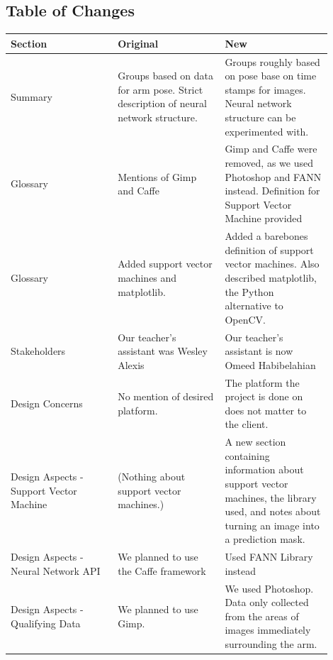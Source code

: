 \documentclass[10pt,journal,compsoc, draftclsnofoot,onecolumn]{IEEEtran}
\begin{document}
\subsection{Table of Changes}
\begin{center}
\begin{tabular}{|p{0.3\linewidth}|p{0.3\linewidth}|p{0.3\linewidth}|}
\hline
Section & Original & New \\ [0.5ex]
\hline\hline

Summary
&
Groups based on data for arm pose.
Strict description of neural network structure.
&
Groups roughly based on pose base on time stamps for images.
Neural network structure can be experimented with.
\\ \hline

Glossary
&
Mentions of Gimp and Caffe
&
Gimp and Caffe were removed, as we used Photoshop and FANN instead.
Definition for Support Vector Machine provided
\\ \hline

Glossary
&
Added support vector machines and matplotlib.
&
Added a barebones definition of support vector machines.
Also described matplotlib, the Python alternative to OpenCV.
\\ \hline

Stakeholders
&
Our teacher's assistant was Wesley Alexis
&
Our teacher's assistant is now Omeed Habibelahian
\\ \hline

Design Concerns
&
No mention of desired platform.
&
The platform the project is done on does not matter to the client.
\\ \hline

Design Aspects - Support Vector Machine
&
(Nothing about support vector machines.)
&
A new section containing information about support vector machines, the library used, and notes about turning an image into a prediction mask.
\\ \hline

Design Aspects - Neural Network API
&
We planned to use the Caffe framework
&
Used FANN Library instead
\\ \hline

Design Aspects - Qualifying Data
&
We planned to use Gimp.
&
We used Photoshop.
Data only collected from the areas of images immediately surrounding the arm.
\\ \hline

\end{tabular}
\end{center}
\end{document}
